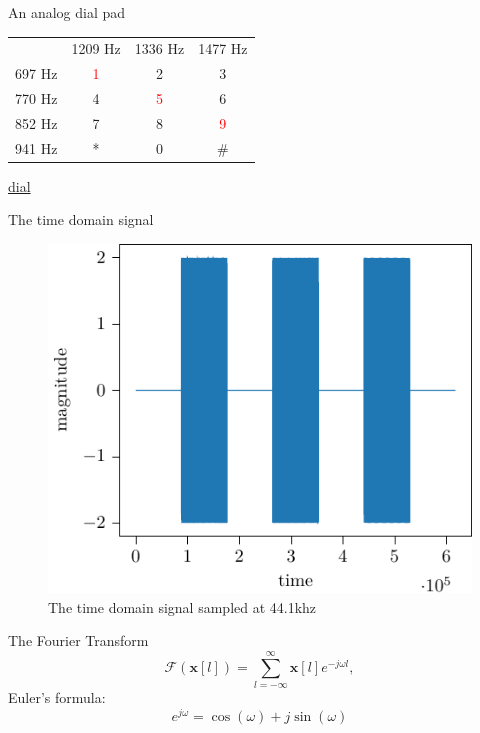 \documentclass[xcolor=dvipsnames]{beamer}
\begin{document}
\begin{frame}{An analog dial pad}
\centering
\begin{tabular}{c c c c}
      & 1209 Hz & 1336 Hz & 1477 Hz \\
697 Hz   & \textcolor{red}{1}    & 2       & 3    \\  
770 Hz   & 4    & \textcolor{red}{5}       & 6    \\
852 Hz   & 7    & 8       & \textcolor{red}{9}    \\
941 Hz   & *    & 0       & \#     \\
\end{tabular}

\begin{center}
\href{run:./phone_seq.wav}{dial}
\end{center}
\end{frame}


\begin{frame}{The time domain signal}
\centering
\begin{figure}
\includegraphics[width=.6\linewidth]{plots/seq_plot.pdf}
\caption{The time domain signal sampled at 44.1khz}
\end{figure}
\end{frame}

\begin{frame}{The Fourier Transform}
\begin{equation}
   \mathcal{F}\left(\mathbf{x}[l]\right) = \sum_{l = -\infty}^{\infty} \mathbf{x}[l]e^{-j\omega l},
    \label{eq:STFT}
\end{equation}
Euler's formula:
\begin{equation}
e^{j\omega} = \cos(\omega) + j\sin (\omega)
\end{equation}
\end{frame}
\end{document}
